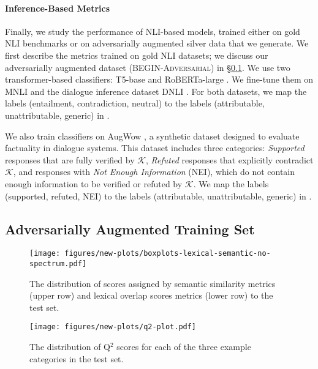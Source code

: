 \paragraph{Inference-Based Metrics} 
Finally, we study the performance of NLI-based models, trained either on gold NLI benchmarks or on adversarially augmented silver data that we generate. We first describe the metrics trained on gold NLI datasets; we discuss our adversarially augmented dataset (\textsc{BEGIN-Adversarial}) in \S\ref{sec:adv}.
We use two transformer-based classifiers: T5-base \cite{raffel2020exploring} and RoBERTa-large \cite{liu2019roberta}.  We fine-tune them on MNLI \cite{williams-etal-2018-broad} and the dialogue inference dataset DNLI  \cite{welleck-etal-2019-dialogue}. For both datasets, we map the labels (entailment, contradiction, neutral) to the labels (attributable, unattributable, generic) in \begindata.

We also train classifiers on AugWow \cite{gupta-etal-2022-dialfact}, a synthetic dataset designed to evaluate factuality in dialogue systems. 
This dataset includes three categories: \textit{Supported} responses that are fully verified by $\mathcal{K}$, \textit{Refuted} responses that explicitly contradict $\mathcal{K}$, and responses with \textit{Not Enough Information} (NEI), which do not contain enough information to be verified or refuted by $\mathcal{K}$.  We map the labels (supported, refuted, NEI) to the labels (attributable, unattributable, generic) in \begindata.
 









\subsection{Adversarially Augmented Training Set}
\label{sec:adv}

\begin{figure*}[ht]
\centering
\texttt{[image: figures/new-plots/boxplots-lexical-semantic-no-spectrum.pdf]}
\caption{\small The distribution of scores assigned by semantic similarity metrics (upper row) and lexical overlap scores metrics (lower row) to the \begindata{} test set. }
  \vspace{-15pt}
  \label{boxplot_lexical_semantic}
\end{figure*}

\begin{figure}[ht]
\centering
\texttt{[image: figures/new-plots/q2-plot.pdf]}
\caption{\small The distribution of Q$^2$ scores for each of the three example categories in the \begindata{} test set. }
\label{q2_boxlot}
\end{figure}





